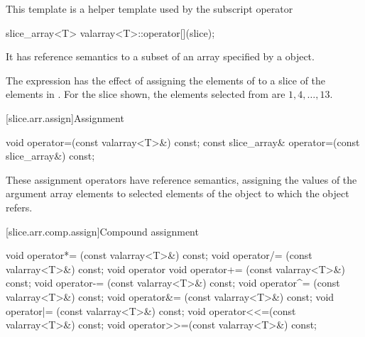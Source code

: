 \pnum
This template is a helper template used by the
 subscript operator
\begin{codeblock}
slice_array<T> valarray<T>::operator[](slice);
\end{codeblock}

\pnum
It has reference semantics to a subset of an array specified by a
object.
\begin{example}
The expression
has the effect of assigning the elements of
to a slice of the elements in
.
For the slice shown, the elements
selected from
are $1, 4, \dotsc, 13$.
\end{example}

[slice.arr.assign]{Assignment}

%
\begin{itemdecl}
void operator=(const valarray<T>&) const;
const slice_array& operator=(const slice_array&) const;
\end{itemdecl}

\begin{itemdescr}
\pnum
These assignment operators have reference semantics,
assigning the values of the argument array elements to selected
elements of the
object to which the
object refers.
\end{itemdescr}

[slice.arr.comp.assign]{Compound assignment}

%
%
%
%
%
%
%
%
%
%
\begin{itemdecl}
void operator*= (const valarray<T>&) const;
void operator/= (const valarray<T>&) const;
void operator%
void operator+= (const valarray<T>&) const;
void operator-= (const valarray<T>&) const;
void operator^= (const valarray<T>&) const;
void operator&= (const valarray<T>&) const;
void operator|= (const valarray<T>&) const;
void operator<<=(const valarray<T>&) const;
void operator>>=(const valarray<T>&) const;
\end{itemdecl}

